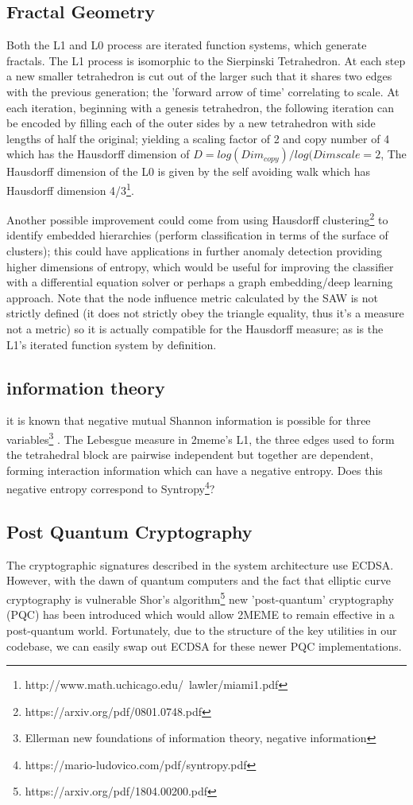 \documentclass{article}
\begin{document}
\subsection{Fractal Geometry}
Both the L1 and L0 process are iterated function systems, which generate fractals. The L1 process is isomorphic to the Sierpinski Tetrahedron. At each step a new smaller tetrahedron is cut out of the larger such that it shares two edges with the previous generation; the 'forward arrow of time' correlating to scale. At each iteration, beginning with a genesis tetrahedron, the following iteration can be encoded by filling each of the outer sides by a new tetrahedron with side lengths of half the original; yielding a scaling factor of 2 and copy number of 4 which has the Hausdorff dimension of $D=log(Dim_{copy})/log(Dim{scale}=2$, The Hausdorff dimension of the L0 is given by the self avoiding walk which has Hausdorff dimension 4/3\footnote{http://www.math.uchicago.edu/~lawler/miami1.pdf}.

	Another possible improvement could come from using Hausdorff clustering\footnote{https://arxiv.org/pdf/0801.0748.pdf} to identify embedded hierarchies (perform classification in terms of the surface of clusters); this could have applications in further anomaly detection providing higher dimensions of entropy, which would be useful for improving the classifier with a differential equation solver or perhaps a graph embedding/deep learning approach. Note that the node influence metric calculated by the SAW is not strictly defined (it does not strictly obey the triangle equality, thus it's a measure not a metric) so it is actually compatible for the Hausdorff measure; as is the L1's iterated function system by definition. 
	
\subsection{information theory}
it is known that negative mutual Shannon information is possible for three variables\footnote{Ellerman new foundations of information theory, negative information} . The Lebesgue measure in 2meme's L1, the three edges used to form the tetrahedral block are pairwise independent but together are dependent, forming interaction information which can have a negative entropy. Does this negative entropy correspond to Syntropy\footnote{https://mario-ludovico.com/pdf/syntropy.pdf}?

\subsection{Post Quantum Cryptography}
	The cryptographic signatures described in the system architecture use ECDSA. However, with the dawn of quantum computers and the fact that elliptic curve cryptography is vulnerable Shor's algorithm\footnote{https://arxiv.org/pdf/1804.00200.pdf} new 'post-quantum' cryptography (PQC) has been introduced which would allow 2MEME to remain effective in a post-quantum world. Fortunately, due to the structure of the key utilities in our codebase, we can easily swap out ECDSA for these newer PQC implementations. 
\end{document}
